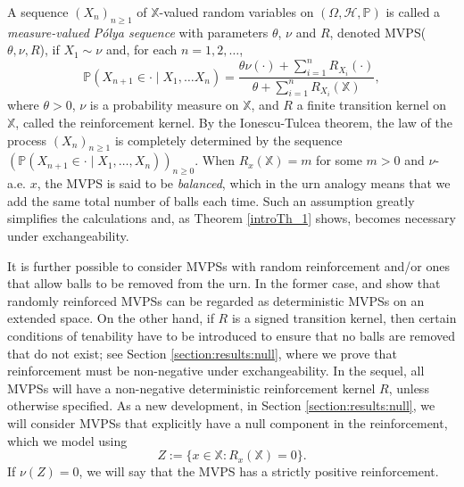 \documentclass[a4paper]{article}
\theoremstyle{plain}
\theoremstyle{remark}
\theoremstyle{definition}
\newcommand{\Polya}{P\'{o}lya }
\begin{document}
A sequence $(X_n)_{n\geq 1}$ of $\mathbb{X}$-valued random variables on $(\Omega,\mathcal{H},\mathbb{P})$ is called a \textit{measure-valued \Polya sequence} with parameters $\theta$, $\nu$ and $R$, denoted MVPS($\theta,\nu,R$), if $X_1\sim\nu$ and, for each $n=1,2,\ldots$,
\begin{equation}\label{model:mvps:predictive}
\mathbb{P}(X_{n+1}\in \cdot\mid X_1, \ldots X_n) = \frac{\theta\nu(\cdot)+\sum_{i=1}^nR_{X_i}(\cdot)}{\theta+\sum_{i=1}^nR_{X_i}(\mathbb{X})},
\end{equation}
where $\theta>0$, $\nu$ is a probability measure on $\mathbb{X}$, and $R$ a finite transition kernel on $\mathbb{X}$, called the reinforcement kernel. By the Ionescu-Tulcea theorem, the law of the process $(X_n)_{n\geq 1}$ is completely determined by the sequence $(\mathbb{P}(X_{n+1}\in\cdot\mid X_1,\ldots,X_n))_{n\geq0}$. When $R_x(\mathbb{X})=m$ for some $m>0$ and $\nu$-a.e. $x$, the MVPS is said to be \emph{balanced}, which in the urn analogy means that we add the same total number of balls each time. Such an assumption greatly simplifies the calculations and, as Theorem \ref{introTh_1} shows, becomes necessary under exchangeability. 

It is further possible to consider MVPSs with random reinforcement and/or ones that allow balls to be removed from the urn. In the former case, \cite[][Theorem 1.3]{janson2019} and \cite[][p.\,6]{sariev2021} show that randomly reinforced MVPSs can be regarded as deterministic MVPSs on an extended space. On the other hand, if $R$ is a signed transition kernel, then certain conditions of tenability have to be introduced to ensure that no balls are removed that do not exist; see Section \ref{section:results:null}, where we prove that reinforcement must be non-negative under exchangeability. In the sequel, all MVPSs will have a non-negative deterministic reinforcement kernel $R$, unless otherwise specified. As a new development, in Section \ref{section:results:null}, we will consider MVPSs that explicitly have a null component in the reinforcement, which we model using
\[Z:=\{x\in\mathbb{X}:R_x(\mathbb{X})=0\}.\]
If $\nu(Z)=0$, we will say that the MVPS has a strictly positive reinforcement.
\end{document}

